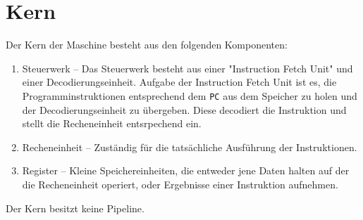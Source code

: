 \section{Kern}
\label{sec:Kern}

Der Kern der Maschine besteht aus den folgenden Komponenten:

\begin{enumerate}
  \item Steuerwerk --
   Das Steuerwerk besteht aus einer "Instruction Fetch Unit" und einer
   Decodierungseinheit. Aufgabe der Instruction Fetch Unit ist es, die
   Programminstruktionen entsprechend dem \texttt{PC} aus dem Speicher zu holen
   und der Decodierungseinheit zu übergeben. Diese decodiert die Instruktion und
   stellt die Recheneinheit entsrpechend ein.
  \item Recheneinheit --
   Zuständig für die tatsächliche Ausführung der Instruktionen. 
  \item Register --
   Kleine Speichereinheiten, die entweder jene Daten halten auf der die Recheneinheit
   operiert, oder Ergebnisse einer Instruktion aufnehmen.
\end{enumerate}

Der Kern besitzt keine Pipeline.
